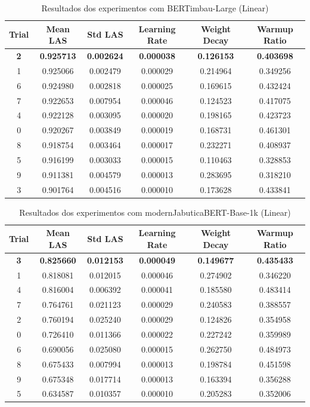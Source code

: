 \begin{table}[ht]
\centering
\caption{Resultados dos experimentos com BERTimbau-Large (Linear)}
\label{tab:bertimbau-large-results}
\begin{tabular}{c c c c c c}
\hline
\textbf{Trial} & \textbf{Mean LAS} & \textbf{Std LAS} & \textbf{Learning Rate} & \textbf{Weight Decay} & \textbf{Warmup Ratio} \\
\hline
\textbf{2} & \textbf{0.925713} & \textbf{0.002624} & \textbf{0.000038} & \textbf{0.126153} & \textbf{0.403698} \\
1 & 0.925066 & 0.002479 & 0.000029 & 0.214964 & 0.349256 \\
6 & 0.924980 & 0.002818 & 0.000025 & 0.169615 & 0.432424 \\
7 & 0.922653 & 0.007954 & 0.000046 & 0.124523 & 0.417075 \\
4 & 0.922128 & 0.003095 & 0.000020 & 0.198165 & 0.423723 \\
0 & 0.920267 & 0.003849 & 0.000019 & 0.168731 & 0.461301 \\
8 & 0.918754 & 0.003464 & 0.000017 & 0.232271 & 0.408937 \\
5 & 0.916199 & 0.003033 & 0.000015 & 0.110463 & 0.328853 \\
9 & 0.911381 & 0.004579 & 0.000013 & 0.283695 & 0.318210 \\
3 & 0.901764 & 0.004516 & 0.000010 & 0.173628 & 0.433841 \\
\hline
\end{tabular}
\end{table}

\begin{table}[ht]
\centering
\caption{Resultados dos experimentos com modernJabuticaBERT-Base-1k (Linear)}
\label{tab:modernjabuticabert-base-1k-results}
\begin{tabular}{c c c c c c}
\hline
\textbf{Trial} & \textbf{Mean LAS} & \textbf{Std LAS} & \textbf{Learning Rate} & \textbf{Weight Decay} & \textbf{Warmup Ratio} \\
\hline
\textbf{3} & \textbf{0.825660} & \textbf{0.012153} & \textbf{0.000049} & \textbf{0.149677} & \textbf{0.435433} \\
1 & 0.818081 & 0.012015 & 0.000046 & 0.274902 & 0.346220 \\
4 & 0.816004 & 0.006392 & 0.000041 & 0.185580 & 0.483414 \\
7 & 0.764761 & 0.021123 & 0.000029 & 0.240583 & 0.388557 \\
2 & 0.760194 & 0.025240 & 0.000029 & 0.124826 & 0.354958 \\
0 & 0.726410 & 0.011366 & 0.000022 & 0.227242 & 0.359989 \\
6 & 0.690056 & 0.025080 & 0.000015 & 0.262750 & 0.484973 \\
8 & 0.675433 & 0.007994 & 0.000013 & 0.198784 & 0.451598 \\
9 & 0.675348 & 0.017714 & 0.000013 & 0.163394 & 0.356288 \\
5 & 0.634587 & 0.010357 & 0.000010 & 0.205283 & 0.352006 \\
\hline
\end{tabular}
\end{table}

